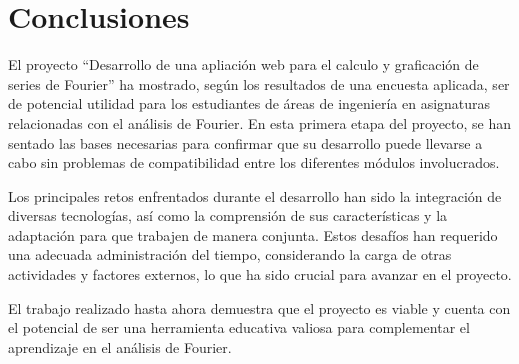 \chapter{Conclusiones}\label{ch:conclusiones}
El proyecto ``Desarrollo de una apliación web para el calculo y graficación de series de Fourier'' ha mostrado, según los resultados de una encuesta aplicada, ser de potencial utilidad para los estudiantes de áreas de ingeniería en asignaturas relacionadas con el análisis de Fourier. En esta primera etapa del proyecto, se han sentado las bases necesarias para confirmar que su desarrollo puede llevarse a cabo sin problemas de compatibilidad entre los diferentes módulos involucrados.
\newline

Los principales retos enfrentados durante el desarrollo han sido la integración de diversas tecnologías, así como la comprensión de sus características y la adaptación para que trabajen de manera conjunta. Estos desafíos han requerido una adecuada administración del tiempo, considerando la carga de otras actividades y factores externos, lo que ha sido crucial para avanzar en el proyecto.
\newline

El trabajo realizado hasta ahora demuestra que el proyecto es viable y cuenta con el potencial de ser una herramienta educativa valiosa para complementar el aprendizaje en el análisis de Fourier.
\newline